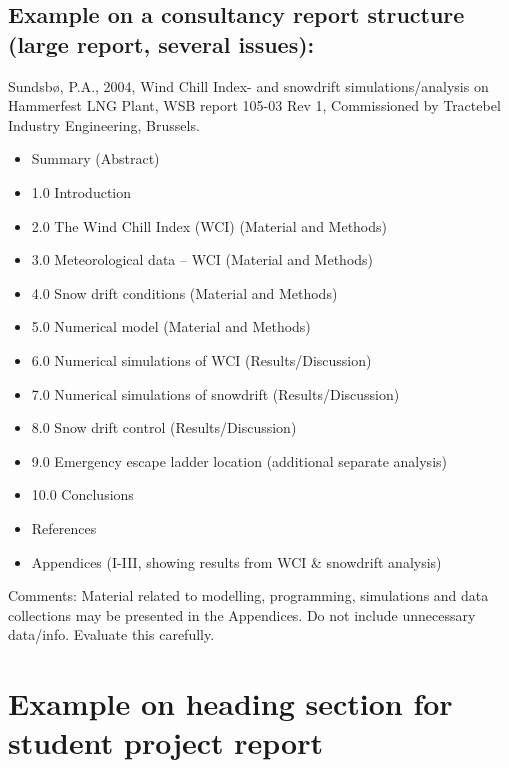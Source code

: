 \documentclass[a4paper,11pt]{extarticle}
\begin{document}
\begin{appendices}
\subsection{Example on a consultancy report structure (large report, several issues):}
Sundsbø, P.A., 2004, Wind Chill Index- and snowdrift simulations/analysis on Hammerfest LNG Plant, WSB report 105-03 Rev 1, Commissioned by Tractebel Industry Engineering, Brussels.

\begin{itemize}
  \item Summary (Abstract)
  \item 1.0 Introduction
  \item 2.0 The Wind Chill Index (WCI) (Material and Methods)
  \item 3.0 Meteorological data – WCI (Material and Methods)
  \item 4.0 Snow drift conditions (Material and Methods)
  \item 5.0 Numerical model (Material and Methods)
  \item 6.0 Numerical simulations of WCI (Results/Discussion)
  \item 7.0 Numerical simulations of snowdrift (Results/Discussion)
  \item 8.0 Snow drift control (Results/Discussion)
  \item 9.0 Emergency escape ladder location (additional separate analysis)
  \item 10.0 Conclusions
  \item References
  \item Appendices (I-III, showing results from WCI \& snowdrift analysis)
\end{itemize}

Comments: Material related to modelling, programming, simulations and data collections may be presented in the Appendices. Do not include unnecessary data/info. Evaluate this carefully.

\pagebreak

\setcounter{figure}{0}
\setcounter{table}{0}
\setcounter{equation}{0}

\renewcommand\thefigure{\thesection.\arabic{figure}}   
\renewcommand\thetable{\thesection.\arabic{table}}   
\renewcommand\theequation{\thesection.\arabic{equation}} 

\section{Example on heading section for student project report}


\end{appendices}
\end{document}

